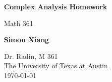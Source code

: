 \documentclass{article}
\begin{document}
\begin{titlepage}
    \begin{center}
        \vspace*{1cm}
 
        \Huge
        \textbf{Complex Analysis Homework}
 
        \vspace{0.5cm}
        \LARGE
        Math 361

        \vspace{1.5cm}
 
        \textbf{Simon Xiang}
 
        \vfill
  
        \vspace{0.8cm}
 
        \Large
    	Dr. Radin, M 361\\
        The University of Texas at Austin\\
        \today
 
    \end{center}
\end{titlepage}
    
    
\end{document}
